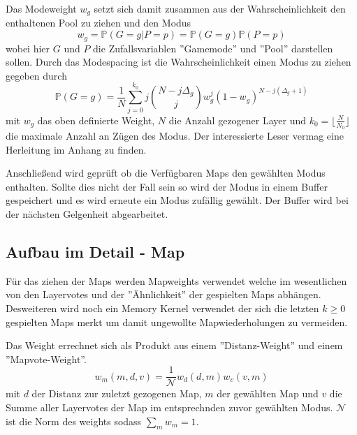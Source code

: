         Das Modeweight $w_g$ setzt sich damit zusammen aus der Wahrscheinlichkeit den enthaltenen Pool zu ziehen und den Modus 
        \begin{equation}
            w_g = \mathbb{P}(G=g|P=p) = \mathbb{P}(G=g)\mathbb{P}(P=p)
        \end{equation}
        wobei hier $G$ und $P$ die Zufallsvariablen ''Gamemode'' und ''Pool'' darstellen sollen.
        Durch das Modespacing ist die Wahrscheinlichkeit einen Modus zu ziehen gegeben durch 
        \begin{equation}
            \mathbb{P}(G=g) = \frac{1}{N}\sum_{j=0}^{k_0}j\binom{N-j \Delta_g}{j}w_g^j(1-w_g)^{N-j(\Delta_g+1)}
        \end{equation}
        mit $w_g$ das oben definierte Weight, $N$ die Anzahl gezogener Layer und $k_0=\lfloor\frac{N}{N_0}\rfloor$ die maximale Anzahl an Zügen des Modus.
        Der interessierte Leser vermag eine Herleitung im Anhang zu finden.

        Anschließend wird geprüft ob die Verfügbaren Maps den gewählten Modus enthalten. Sollte dies nicht der Fall sein so wird der Modus in einem Buffer gespeichert und es wird erneute ein Modus zufällig gewählt. 
        Der Buffer wird bei der nächsten Gelgenheit abgearbeitet.
    \subsection{Aufbau im Detail - Map}
        Für das ziehen der Maps werden Mapweights verwendet welche im wesentlichen von den Layervotes und der ''Ähnlichkeit'' der gespielten Maps abhängen.
        Desweiteren wird noch ein Memory Kernel verwendet der sich die letzten $k\geq 0$ gespielten Maps merkt um damit ungewollte Mapwiederholungen zu vermeiden.

        Das Weight errechnet sich als Produkt aus einem ''Distanz-Weight'' und einem ''Mapvote-Weight''. 
        \begin{equation}
            w_m(m,d,v) = \frac{1}{\mathcal{N}}w_d(d,m)w_v(v,m)
        \end{equation}
        mit $d$ der Distanz zur zuletzt gezogenen Map, $m$ der gewählten Map und $v$ die Summe aller Layervotes der Map im entsprechnden zuvor gewählten Modus.
        $\mathcal{N}$ ist die Norm des weights sodass $\sum_m w_m = 1$.
